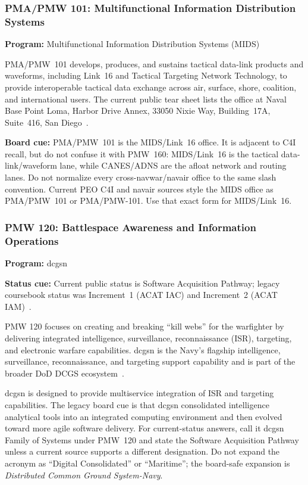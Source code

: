 \documentclass[../main.tex]{subfiles}
\begin{document}
\subsubsection{PMA/PMW 101: Multifunctional Information Distribution Systems}
\label{ssubsec:pma-pmw101}

\textbf{Program:} Multifunctional Information Distribution Systems (MIDS)

PMA/PMW~101 develops, produces, and sustains tactical data-link products and waveforms, including Link~16 and Tactical Targeting Network Technology, to provide interoperable tactical data exchange across air, surface, shore, coalition, and international users. The current public tear sheet lists the office at Naval Base Point Loma, Harbor Drive Annex, 33050 Nixie Way, Building~17A, Suite~416, San Diego~\autocite{PEOC4I-PMA-PMW101-tearsheet-2025}.

\textbf{Board cue:} PMA/PMW~101 is the MIDS/Link~16 office. It is adjacent to C4I recall, but do not confuse it with PMW~160: MIDS/Link~16 is the tactical data-link/waveform lane, while CANES/ADNS are the afloat network and routing lanes. Do not normalize every cross-\ac{navwar}/\ac{navair} office to the same slash convention. Current PEO C4I and \ac{navair} sources style the MIDS office as PMA/PMW~101 or PMA/PMW-101. Use that exact form for MIDS/Link~16\autocite{PEOC4I-PMA-PMW101-tearsheet-2025,NAVAIR-PMA-PMW101}.

\subsubsection{PMW 120: Battlespace Awareness and Information Operations}
\label{ssubsec:pmw120}

\textbf{Program:} \ac{dcgsn}

\textbf{Status cue:} Current public status is Software Acquisition Pathway; legacy coursebook status was Increment~1 (ACAT IAC) and Increment~2 (ACAT IAM)~\autocite{PEOC4I-PMW120-tearsheet-2026}.

PMW 120 focuses on creating and breaking ``kill webs'' for the warfighter by delivering integrated intelligence, surveillance, reconnaissance (ISR), targeting, and electronic warfare capabilities. \ac{dcgsn} is the Navy's flagship intelligence, surveillance, reconnaissance, and targeting support capability and is part of the broader DoD DCGS ecosystem~\autocite{PEOC4I-PMW120-tearsheet-2026}.

\ac{dcgsn} is designed to provide multiservice integration of ISR and targeting capabilities. The legacy board cue is that \ac{dcgsn} consolidated intelligence analytical tools into an integrated computing environment and then evolved toward more agile software delivery. For current-status answers, call it \ac{dcgsn} Family of Systems under PMW~120 and state the Software Acquisition Pathway unless a current source supports a different designation. Do not expand the acronym as ``Digital Consolidated'' or ``Maritime''; the board-safe expansion is \emph{Distributed Common Ground System-Navy}.
\end{document}
